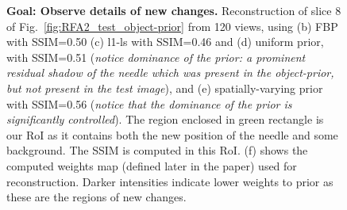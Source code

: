 \documentclass[journal]{IEEEtran}
\begin{document}
\begin{figure}[!h]
\caption[Representative results-2]{\textbf{Goal: Observe details of new changes.} Reconstruction of slice 8 of Fig.~\ref{fig:RFA2_test_object-prior} from 120 views, using (b) FBP with SSIM=0.50 (c) l1-ls with SSIM=0.46 and (d) uniform prior, with SSIM=0.51 (\emph{notice dominance of the prior: a prominent residual shadow of the needle which was present in the object-prior, but not present in the test image}), and (e) spatially-varying prior with SSIM=0.56 (\emph{notice that the dominance of the prior is significantly controlled}). The region enclosed in green rectangle is our RoI as it contains both the new position of the needle and some background. The SSIM is computed in this RoI. (f) shows the computed weights map (defined later in the paper) used for reconstruction. Darker intensities indicate lower weights to prior as these are the regions of new changes.}
\label{fig:RFA2_few_views}
 \vspace{-10mm}
\end{figure}
 
\end{document}

